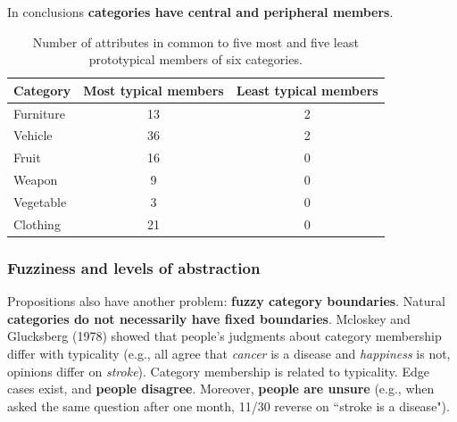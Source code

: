In conclusions \textbf{categories have central and peripheral members}.


\begin{table}[h]
    \centering
    \captionsetup{width=.8\linewidth}
    \begin{tabular}{lcc}
        \hline
        Category & Most typical members & Least typical members \\
        \hline
        Furniture & 13 & 2 \\
        Vehicle & 36 & 2 \\
        Fruit & 16 & 0 \\
        Weapon & 9 & 0 \\
        Vegetable & 3 & 0 \\
        Clothing & 21 & 0 \\
        \hline
    \end{tabular}
    \caption{Number of attributes in common to five most and five least prototypical members of six categories.}
    \label{tab:rosch}
\end{table}

\subsubsection{Fuzziness and levels of abstraction}
Propositions also have another problem: \textbf{fuzzy category boundaries}. Natural \textbf{categories do not necessarily have fixed boundaries}.
Mcloskey and Glucksberg (1978) showed that people's judgments about category membership differ with typicality (e.g., all agree that \textit{cancer} is a disease and \textit{happiness} is not, opinions differ on \textit{stroke}). Category membership is related to typicality. Edge cases exist, and \textbf{people disagree}. Moreover, \textbf{people are unsure} (e.g., when asked the same question after one month, 11/30 reverse on ``stroke is a disease").\\

